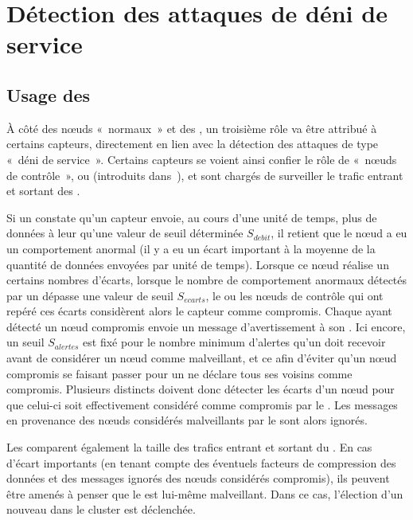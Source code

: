 \section{Détection des attaques de déni de service}
\label{sa:sec:detection}
    \subsection{Usage des \cns}

À côté des nœuds «~normaux~» et des \chs, un troisième rôle va être attribué à certains capteurs, directement en lien avec la détection des attaques de type «~déni de service~».
Certains capteurs se voient ainsi confier le rôle de «~nœuds de contrôle~», ou \cns (introduits dans~\cite{LC08}), et sont chargés de surveiller le trafic entrant et sortant des \chs.

Si un \cn constate qu'un capteur envoie, au cours d'une unité de temps, plus de données à leur \CH qu'une valeur de seuil déterminée $S_{debit}$, il retient que le nœud a eu un comportement anormal (il y a eu un écart important à la moyenne de la quantité de données envoyées par unité de temps).
Lorsque ce nœud réalise un certains nombres d'écarts, \cad lorsque le nombre de comportement anormaux détectés par un \cn dépasse une valeur de seuil $S_{ecarts}$, le ou les nœuds de contrôle qui ont repéré ces écarts considèrent alors le capteur comme compromis.
Chaque \cn ayant détecté un nœud compromis envoie un message d'avertissement à son \ch.
Ici encore, un seuil $S_{alertes}$ est fixé pour le nombre minimum d'alertes qu'un \CH doit recevoir avant de considérer un nœud comme malveillant, et ce afin d'éviter qu'un nœud compromis se faisant passer pour un \cn ne déclare tous ses voisins comme compromis.
Plusieurs \cns distincts doivent donc détecter les écarts d'un nœud pour que celui-ci soit effectivement considéré comme compromis par le \ch.
Les messages en provenance des nœuds considérés malveillants par le \ch sont alors ignorés.

Les \cns comparent également la taille des trafics entrant et sortant du \ch.
En cas d'écart importants (en tenant compte des éventuels facteurs de compression des données et des messages ignorés des nœuds considérés compromis), ils peuvent être amenés à penser que le \ch est lui-même malveillant.
Dans ce cas, l'élection d'un nouveau \CH dans le cluster est déclenchée.

